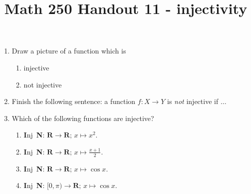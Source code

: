 \documentclass[12pt, reqno]{amsart}
\begin{document}
\title[Math 250 Handout 11 - injectivity and surjectivity warmup]{Math 250 Handout 11 - injectivity}\maketitle





\begin{enumerate}

\item Draw a picture of a function which is 
  \begin{enumerate}
  \item injective\vspace{3cm}
  \item not injective\vspace{3cm}
  \end{enumerate}

\item Finish the following sentence: a function $f\colon X \to Y$ is
  \emph{not} injective if $\ldots$\\ \vspace{3cm}





\newpage
\item Which of the following functions are injective?\vspace{22pt}


  \begin{enumerate}
  \item \textbf{I}nj\,  \textbf{N}:
    \hspace{12pt}
$\mathbf{R} \to \mathbf{R};\, x \mapsto x^2$.
\vspace{22pt}

  \item \textbf{I}nj\,  \textbf{N}:
    \hspace{12pt}
$\mathbf{R} \to \mathbf{R};\, x \mapsto \frac{x+1}{2}$.
\vspace{22pt}

  \item \textbf{I}nj\,  \textbf{N}:
    \hspace{12pt}
$\mathbf{R} \to \mathbf{R};\, x \mapsto \cos{x}$.
\vspace{22pt}

  \item \textbf{I}nj\,  \textbf{N}:
    \hspace{12pt}
$[0,\pi) \to \mathbf{R};\, x \mapsto \cos{x}$.
\vspace{22pt}



\end{enumerate}
\end{enumerate}
\end{document}
